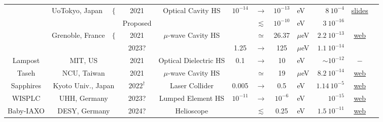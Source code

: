 \begin{table}[!p]
\begin{center}
{\begin{tabular}{ccccccclrcc}
        \rule{0pt}{1ex}
        \multirow{2}{*}{\sc DANCE} & \multirow{2}{*}{UoTokyo, Japan ~~$\Big\{$ } & 2021 & \multirow{2}{*}{Optical Cavity HS} & $10^{-14}$ &$\to$ &$10^{-13}$ &eV &$8\ 10^{-4}$  & \multirow{2}{*}{\href{https://granite.phys.s.u-tokyo.ac.jp/oshima/presentation/KashiwaDM_Oshima_ver3.pdf}{slides}}  & \multirow{2}{*}{\cite{DANCE}}
        \\
        & & Proposed & & &$\lesssim$& $10^{-10}$ &eV & $3\ 10^{-16}$ 
        & &
        \\ 

        \rule{0pt}{1ex}
        \multirow{2}{*}{\sc GrAHal} & \multirow{2}{*}{Grenoble, France~~$\Big\{$ } & 2021 & \multirow{2}{*}{$\mu$-wave Cavity HS} & &$\simeq$ &26.37 &$\mu$eV & $2.2\ 10^{-13}$ & \multirow{2}{*}{\href{https://grahal.neel.cnrs.fr/}{web}} & \multirow{2}{*}{\cite{GrAHal}}
        \\
        & & 2023? & & 1.25 &$\to$ &125 &$\mu$eV & $1.1\ 10^{-14}$ & &
        \\

        \rule{0pt}{1ex}
        {\sc Lampost} & MIT, US & 2021 & Optical Dielectric HS & 0.1 &$\to$ &10 &eV & $\sim 10^{-12}$ & $-$ &\cite{LAMPOST}
        \\

        \rule{0pt}{1ex}
        {\sc Taseh} & NCU, Taiwan & 2021 & $\mu$-wave Cavity HS &  &$\simeq$ & 19 &$\mu$eV & $8.2\ 10^{-14}$ &\href{http://taseh.phy.ncu.edu.tw/}{web} & \cite{TASEH}
        \\

        \rule{0pt}{1ex}
        {\sc Sapphires} & Kyoto Univ., Japan &  $2022^{\dagger}$ & Laser Collider &0.005 &$\to$ &0.5 & eV & $1.14\ 10^{-5}$ &\href{https://www.spphrs.hiroshima-u.ac.jp/index.html}{web} &\cite{SAPPHIRES}
        \\

        \rule{0pt}{1ex}
        {\sc WISPLC} & UHH, Germany & 2023? & Lumped Element HS & $10^{-11}$ &$\to$ & $10^{-6}$ & eV & $10^{-15}$ &\href{https://www.physik.uni-hamburg.de/en/iexp/gruppe-horns/forschung.html}{web} & \cite{WISPLC}
        \\

        \rule{0pt}{1ex}
        {\sc Baby-IAXO} & DESY, Germany & 2024? & Helioscope & &$\lesssim$ & 0.25 & eV & $1.5\  10^{-11}$ &\href{https://iaxo.desy.de/}{web} & \cite{IAXO}
        \\


\end{tabular}}
\end{center}
\end{table}
